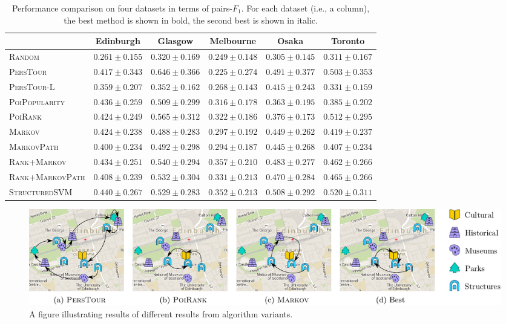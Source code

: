 \begin{table}
\caption{Performance comparison on four datasets in terms of pairs-$F_1$.
         For each dataset (i.e., a column), the best method is shown in bold, the second best is shown in italic.}
\label{tab:pairf1}
\centering
\begin{tabular}{l|ccccc} \hline
 & Edinburgh & Glasgow & Melbourne & Osaka & Toronto \\ \hline
\textsc{Random} & $0.261\pm0.155$ & $0.320\pm0.169$ & $0.249\pm0.148$ & $0.305\pm0.145$ & $0.311\pm0.167$ \\
\textsc{PersTour}\cite{ijcai15} & $0.417\pm0.343$ & $\mathbf{0.646\pm0.366}$ & $0.225\pm0.274$ & $\mathit{0.491\pm0.377}$ & $0.503\pm0.353$ \\
\textsc{PersTour-L} & $0.359\pm0.207$ & $0.352\pm0.162$ & $0.268\pm0.143$ & $0.415\pm0.243$ & $0.331\pm0.159$ \\
\textsc{PoiPopularity} & $\mathit{0.436\pm0.259}$ & $0.509\pm0.299$ & $0.316\pm0.178$ & $0.363\pm0.195$ & $0.385\pm0.202$ \\
\textsc{PoiRank} & $0.424\pm0.249$ & $\mathit{0.565\pm0.312}$ & $0.322\pm0.186$ & $0.376\pm0.173$ & $\mathit{0.512\pm0.295}$ \\
\textsc{Markov} & $0.424\pm0.238$ & $0.488\pm0.283$ & $0.297\pm0.192$ & $0.449\pm0.262$ & $0.419\pm0.237$ \\
\textsc{MarkovPath} & $0.400\pm0.234$ & $0.492\pm0.298$ & $0.294\pm0.187$ & $0.445\pm0.268$ & $0.407\pm0.234$ \\
\textsc{Rank+Markov} & $0.434\pm0.251$ & $0.540\pm0.294$ & $\mathbf{0.357\pm0.210}$ & $0.483\pm0.277$ & $0.462\pm0.266$ \\
\textsc{Rank+MarkovPath} & $0.408\pm0.239$ & $0.532\pm0.304$ & $0.331\pm0.213$ & $0.470\pm0.284$ & $0.465\pm0.266$ \\
\textsc{StructuredSVM} & $\mathbf{0.440\pm0.267}$ & $0.529\pm0.283$ & $\mathit{0.352\pm0.213}$ & $\mathbf{0.508\pm0.292}$ & $\mathbf{0.520\pm0.311}$ \\
\hline
\end{tabular}
\end{table}


\begin{figure}[htbp]
	\centering
	\includegraphics[width=\textwidth]{fig/example-tour.pdf}
	\caption{A figure illustrating results of different results from algorithm variants. 
}
	\label{fig:exampleresult}
\end{figure}


